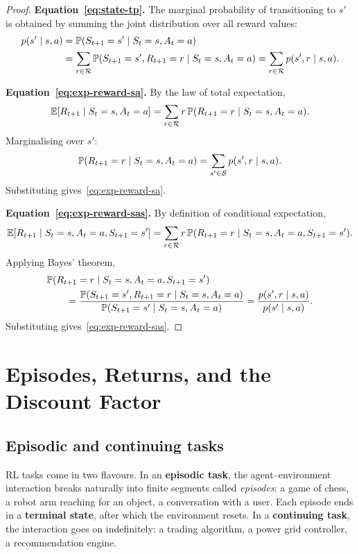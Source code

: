 \begin{proof}
\textbf{Equation~\eqref{eq:state-tp}.} The marginal probability of transitioning to $s'$ is obtained by summing the joint distribution over all reward values:
\begin{align*}
p(s' \mid s, a)
&= \mathbb{P}(S_{t+1} = s' \mid S_t = s, A_t = a)\\
&= \sum_{r \in \mathcal{R}} \mathbb{P}(S_{t+1} = s', R_{t+1} = r \mid S_t = s, A_t = a)
= \sum_{r \in \mathcal{R}} p(s', r \mid s, a).
\end{align*}

\textbf{Equation~\eqref{eq:exp-reward-sa}.} By the law of total expectation,
\[
\operatorname{\mathbb{E}}[R_{t+1} \mid S_t = s, A_t = a]
= \sum_{r \in \mathcal{R}} r\, \mathbb{P}(R_{t+1} = r \mid S_t = s, A_t = a).
\]
Marginalising over $s'$:
\[
\mathbb{P}(R_{t+1} = r \mid S_t = s, A_t = a)
= \sum_{s' \in \mathcal{S}} p(s', r \mid s, a).
\]
Substituting gives~\eqref{eq:exp-reward-sa}.

\textbf{Equation~\eqref{eq:exp-reward-sas}.} By definition of conditional expectation,
\[
\operatorname{\mathbb{E}}[R_{t+1} \mid S_t = s, A_t = a, S_{t+1} = s']
= \sum_{r \in \mathcal{R}} r\, \mathbb{P}(R_{t+1} = r \mid S_t = s, A_t = a, S_{t+1} = s').
\]
Applying Bayes' theorem,
\begin{align*}
&\mathbb{P}(R_{t+1} = r \mid S_t = s, A_t = a, S_{t+1} = s')\\
&\qquad= \frac{\mathbb{P}(S_{t+1} = s', R_{t+1} = r \mid S_t = s, A_t = a)}{\mathbb{P}(S_{t+1} = s' \mid S_t = s, A_t = a)}
= \frac{p(s', r \mid s, a)}{p(s' \mid s, a)}.
\end{align*}
Substituting gives~\eqref{eq:exp-reward-sas}.
\end{proof}


\section{Episodes, Returns, and the Discount Factor}
\label{sec:returns}

\subsection*{Episodic and continuing tasks}

RL tasks come in two flavours. In an \textbf{episodic task}, the agent--environment interaction breaks naturally into finite segments called \emph{episodes}: a game of chess, a robot arm reaching for an object, a conversation with a user. Each episode ends in a \textbf{terminal state}, after which the environment resets. In a \textbf{continuing task}, the interaction goes on indefinitely: a trading algorithm, a power grid controller, a recommendation engine.

